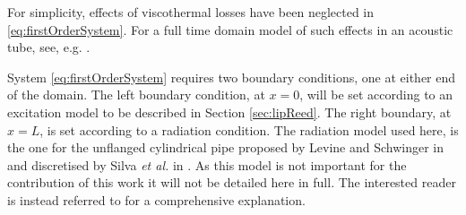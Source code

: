 For simplicity, effects of viscothermal losses have been neglected in \eqref{eq:firstOrderSystem}. For a full time domain model of such effects in an acoustic tube, see, e.g. \cite{Bilbao2016}. 

System \eqref{eq:firstOrderSystem} requires two boundary conditions, one at either end of the domain. The left boundary condition, at $x=0$, will be set according to an excitation model to be described in Section \ref{sec:lipReed}. The right boundary, at $x=L$, is set according to a radiation condition. %
The radiation model used here, is the one for the unflanged cylindrical pipe proposed by Levine and Schwinger in \cite{Levine1948} and discretised by Silva \emph{et al.} in \cite{Silva2009}. As this model is not important for the contribution of this work it will not be detailed here in full. The interested reader is instead referred to \cite{Bilbao2013, Harrison2018} for a comprehensive explanation. %



